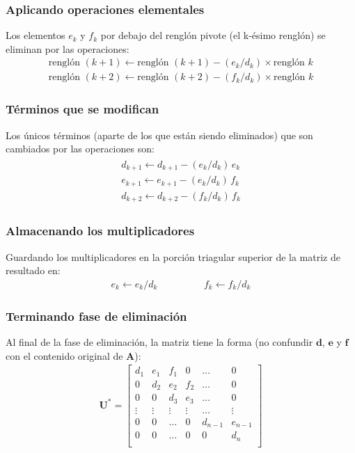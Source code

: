 \documentclass[12pt]{beamer}
\begin{document}
\begin{frame}
\frametitle{Aplicando operaciones elementales}
Los elementos $e_{k}$ y $f_{k}$ por debajo del renglón pivote (el k-ésimo renglón) se eliminan por las operaciones:
\pause
\begin{align*}
\text{renglón } (k + 1) \leftarrow \text{renglón } (k + 1) - (e_{k}/d_{k}) \times \text{renglón } k \\[0.5em]
\text{renglón } (k + 2) \leftarrow \text{renglón } (k + 2) - (f_{k}/d_{k}) \times \text{renglón } k
\end{align*}
\end{frame}
\begin{frame}
\frametitle{Términos que se modifican}
Los únicos términos (aparte de los que están siendo eliminados) que son cambiados por las operaciones son:
\pause
\begin{align}
\begin{aligned}
d_{k+1} \leftarrow d_{k+1} - (e_{k}/d_{k}) \, e_{k} \\[0.5em]
e_{k+1} \leftarrow e_{k+1} - (e_{k}/d_{k}) \, f_{k} \\[0.5em]
d_{k+2} \leftarrow d_{k+2} - (f_{k}/d_{k}) \, f_{k}
\end{aligned}
\label{eq:ecuacion_02_27a}
\end{align}
\end{frame}
\begin{frame}
\frametitle{Almacenando los multiplicadores}
Guardando los multiplicadores en la porción triagular superior de la matriz de resultado en:
\pause
\begin{align}
e_{k} \leftarrow e_{k}/d_{k} \hspace{2cm} f_{k} \leftarrow f_{k}/d_{k}
\label{eq:ecuacion_02_27b}
\end{align}
\end{frame}
\begin{frame}
\frametitle{Terminando fase de eliminación}
Al final de la fase de eliminación, la matriz tiene la forma (no confundir $\mathbf{d}$, $\mathbf{e}$ y $\mathbf{f}$ con el contenido original de $\mathbf{A}$):
\pause
\renewcommand{\arraystretch}{0.9}
\begin{align*}
\mathbf{U}^{*} =
\begin{bmatrix}
d_{1} & e_{1} & f_{1} & 0 & \ldots & 0 \\
0 & d_{2} & e_{2} & f_{2} & \ldots & 0 \\
0 & 0 & d_{3} & e_{3} & \ldots & 0 \\
\vdots & \vdots & \vdots & \vdots & \ldots & \vdots \\
0 & 0 & \ldots & 0 & d_{n-1} & e_{n-1} \\
0 & 0 & \ldots & 0 & 0 & d_{n} \\
\end{bmatrix}
\end{align*}
\end{frame}
\end{document}
